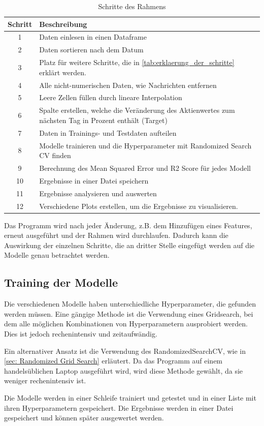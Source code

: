 \begin{table}[H]
    \begin{tabularx}{\textwidth}{|c|X|}
        \hline
        \rowcolor{lightgray}
        \textbf{Schritt} & \textbf{Beschreibung} \\ \hline
        1 & Daten einlesen in einen Dataframe \\ \hline
        2 & Daten sortieren nach dem Datum\\ \hline
        3 & Platz für weitere Schritte, die in \autoref{tab:erklaerung_der_schritte} erklärt werden. \\ \hline
        4 & Alle nicht-numerischen Daten, wie Nachrichten entfernen\\ \hline
        5 & Leere Zellen füllen durch lineare Interpolation\\ \hline
        6 & Spalte erstellen, welche die Veränderung des Aktienwertes zum nächsten Tag in Prozent enthält (Target)\\ \hline
        7 & Daten in Trainings- und Testdaten aufteilen\\ \hline
        8 & Modelle trainieren und die Hyperparameter mit Randomized Search CV finden\\ \hline
        9 & Berechnung des Mean Squared Error und R2 Score für jedes Modell\\ \hline
        10 & Ergebnisse in einer Datei speichern \\ \hline
        11 & Ergebnisse analysieren und auswerten \\ \hline
        12 & Verschiedene Plots erstellen, um die Ergebnisse zu visualisieren.\\ \hline
    \end{tabularx}
    \caption{Schritte des Rahmens}
    \label{tab:schritte_des_rahmens}
\end{table}

Das Programm wird nach jeder Änderung, z.B. dem Hinzufügen eines Features, erneut ausgeführt und der Rahmen wird durchlaufen. Dadurch kann die Auswirkung der einzelnen Schritte, die an dritter Stelle eingefügt werden auf die Modelle genau betrachtet werden.

\subsection{Training der Modelle}\label{sec:Modelle}
Die verschiedenen Modelle haben unterschiedliche Hyperparameter, die gefunden werden müssen. Eine gängige Methode ist die Verwendung eines Gridsearch, bei dem alle möglichen Kombinationen von Hyperparametern ausprobiert werden. Dies ist jedoch rechenintensiv und zeitaufwändig.
\par
Ein alternativer Ansatz ist die Verwendung des RandomizedSearchCV, wie in \autoref{sec: Randomized Grid Search} erläutert. Da das Programm auf einem handelsüblichen Laptop ausgeführt wird, wird diese Methode gewählt, da sie weniger rechenintensiv ist.
\par
Die Modelle werden in einer Schleife trainiert und getestet und in einer Liste mit ihren Hyperparametern gespeichert. Die Ergebnisse werden in einer Datei gespeichert und können später ausgewertet werden.

